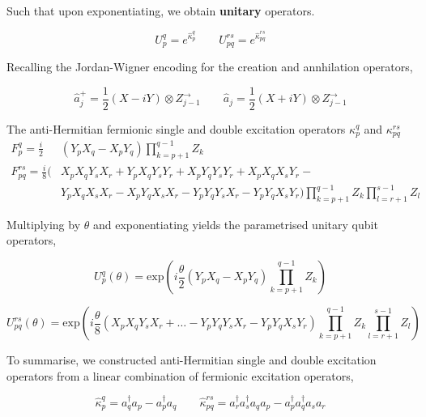 Such that upon exponentiating, we obtain \textbf{unitary} operators.

\begin{equation*}
    U^q_p = e^{\hat\kappa_p^q} \qquad
    U_{pq}^{rs} = e^{\hat\kappa_{pq}^{rs}}
\end{equation*}

Recalling the Jordan-Wigner encoding for the creation and annhilation operators,

\begin{equation*}
    \hat a_j^+ = \frac{1}{2} (X - iY) \otimes Z^\rightarrow_{j-1} \qquad
    \hat a_j = \frac{1}{2} (X + iY) \otimes Z^\rightarrow_{j-1}
\end{equation*}

The anti-Hermitian fermionic single and double excitation operators $\kappa_p^q$ and $\kappa_{pq}^{rs}$
\begin{align*}
    F_p^q = \frac{i}{2} & (Y_p X_q - X_p Y_q) \prod_{k=p+1}^{q-1} Z_k \\
    F_{pq}^{rs} = \frac{i}{8} (
      & X_p X_q Y_s X_r +
        Y_p X_q Y_s Y_r +
        X_p Y_q Y_s Y_r +
        X_p X_q X_s Y_r - \\
      & Y_p X_q X_s X_r -
        X_p Y_q X_s X_r -
        Y_p Y_q Y_s X_r -
        Y_p Y_q X_s Y_r )
    \prod_{k=p+1}^{q-1} Z_k
    \prod_{l=r+1}^{s-1} Z_l
\end{align*}

Multiplying by $\theta$ and exponentiating yields the parametrised unitary qubit operators,

\begin{equation*}
    U^q_p (\theta) =
    \text{exp} \left( i
    \frac{\theta}{2} (Y_p X_q - X_p Y_q) \prod_{k=p+1}^{q-1} Z_k \right)
\end{equation*}

\begin{equation*}
    U^{rs}_{pq} (\theta) = \text{exp} \left( i \frac{\theta}{8} (
    X_p X_q Y_s X_r
    + \dots -
    Y_p Y_q Y_s X_r -
    Y_p Y_q X_s Y_r )
    \prod_{k=p+1}^{q-1} Z_k
    \prod_{l=r+1}^{s-1} Z_l
    \right)
\end{equation*}

To summarise, we constructed anti-Hermitian single and double excitation operators from a linear combination of fermionic excitation operators,

\begin{equation*}
    \hat\kappa_p^q = a_q^\dagger a_p - a_p^\dagger a_q \qquad
    \hat\kappa_{pq}^{rs} =
    a_r^\dagger a_s^\dagger a_q a_p - a_p^\dagger a_q^\dagger a_s a_r
\end{equation*}\smallskip

